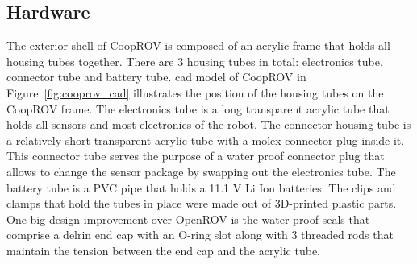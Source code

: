 \documentclass {udthesis}
\begin{document}
\subsection{Hardware}

The exterior shell of CoopROV is composed of an acrylic frame that holds all housing tubes together. There are 3 housing tubes in total: electronics tube, connector tube and battery tube. \gls{cad} model of CoopROV in Figure~\ref{fig:cooprov_cad} illustrates the position of the housing tubes on the CoopROV frame. The electronics tube is a long transparent acrylic tube that holds all sensors and most electronics of the robot. The connector housing tube is a relatively short transparent acrylic tube with a molex connector plug inside it. This connector tube serves the purpose of a water proof connector plug that allows to change the sensor package by swapping out the electronics tube. The battery tube is a PVC pipe that holds a 11.1 V Li Ion batteries. The clips and clamps that hold the tubes in place were made out of 3D-printed plastic parts. One big design improvement over OpenROV is the water proof seals that comprise a delrin end cap with an O-ring slot along with 3 threaded rods that maintain the tension 
between the end cap and the acrylic tube. 
%
\end{document}
